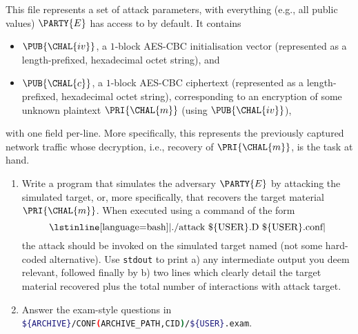 \documentclass[crop={false},multi={true},tikz={true}]{standalone}
\begin{document}

This file represents a set of attack parameters, with everything (e.g.,
all public values) $\PARTY{E}$ has access to by default.  It contains 

\begin{itemize}
\item $\PUB{\CHAL{iv}}$,
      a  ${1}$-block AES-CBC initialisation vector
      (represented as a  length-prefixed, hexadecimal octet   string),
      and
\item $\PUB{\CHAL{c}}$,
      a  ${1}$-block AES-CBC ciphertext 
      (represented as a  length-prefixed, hexadecimal octet   string),
      corresponding to an encryption of some unknown plaintext 
      $\PRI{\CHAL{m}}$ (using $\PUB{\CHAL{iv}}$),
\end{itemize}

\noindent
with one field per-line.
More specifically, this represents the previously captured network traffic
whose decryption, i.e., recovery of $\PRI{\CHAL{m}}$, is the task at hand.
%


\begin{enumerate}
\item Write a program that simulates the adversary $\PARTY{E}$ by attacking
      the simulated target, or, more specifically, that recovers the target 
      material $\PRI{\CHAL{m}}$.  
      When executed using a command of the form
      \[
      \mbox{\lstinline[language={bash}]|./attack \$\{USER\}.D \$\{USER\}.conf|}
      \]
      the attack should be invoked on the simulated target named (not some
      hard-coded alternative).  Use \lstinline[language={bash}]{stdout} to 
      print 
      a) any intermediate output you deem relevant, followed finally by 
      b) two lines which clearly detail the target material recovered plus
         the total number of interactions with attack target.
\item Answer the exam-style questions in 
      \lstinline[language={bash}]|${ARCHIVE}/CONF(ARCHIVE_PATH,CID)/${USER}.exam|.
\end{enumerate}
\end{document}
